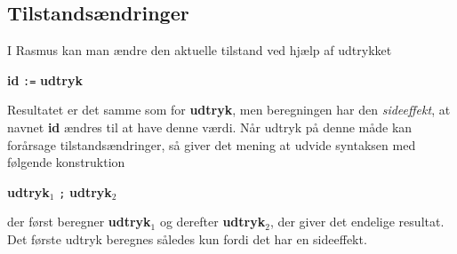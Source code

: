 \documentclass{article}
\newcounter{eks}
\begin{document}
\subsection{Tilstands\ae{}ndringer}
I {\sc Rasmus} kan man \ae{}ndre den aktuelle tilstand ved hj\ae{}lp af 
udtrykket
\begin{center}
{\bf id} \verb":=" {\bf udtryk}
\end{center}
Resultatet er det samme som for {\bf udtryk}, men beregningen har
den {\em sideeffekt}, at navnet {\bf id} \ae{}ndres til at have denne
v\ae{}rdi. N\aa{}r udtryk p\aa{} denne m\aa{}de kan for\aa{}rsage tilstands\ae{}ndringer, s\aa{}
giver det mening at udvide syntaksen med f\o{}lgende konstruktion
\begin{center}
{\bf udtryk$_1$} \verb";" {\bf udtryk$_2$}
\end{center}
der f\o{}rst beregner {\bf udtryk$_1$} og derefter {\bf udtryk$_2$},
der giver det endelige resultat. Det f\o{}rste udtryk beregnes s\aa{}ledes
kun fordi det har en sideeffekt.

        

\end{document}
